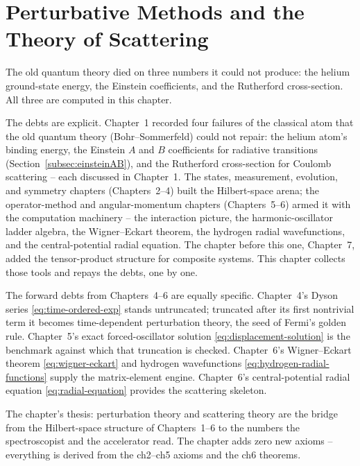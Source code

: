 \chapter{Perturbative Methods and the Theory of Scattering}

The old quantum theory died on three numbers it could not produce: the helium ground-state energy, the Einstein coefficients, and the Rutherford cross-section. All three are computed in this chapter.

The debts are explicit. Chapter~1 recorded four failures of the classical atom that the old quantum theory (Bohr--Sommerfeld) could not repair: the helium atom's binding energy, the Einstein $A$ and $B$ coefficients for radiative transitions (Section~\ref{subsec:einsteinAB}), and the Rutherford cross-section for Coulomb scattering -- each discussed in Chapter~1. The states, measurement, evolution, and symmetry chapters (Chapters~2--4) built the Hilbert-space arena; the operator-method and angular-momentum chapters (Chapters~5--6) armed it with the computation machinery -- the interaction picture, the harmonic-oscillator ladder algebra, the Wigner--Eckart theorem, the hydrogen radial wavefunctions, and the central-potential radial equation. The chapter before this one, Chapter~7, added the tensor-product structure for composite systems. This chapter collects those tools and repays the debts, one by one.

The forward debts from Chapters~4--6 are equally specific. Chapter~4's Dyson series \eqref{eq:time-ordered-exp} stands untruncated; truncated after its first nontrivial term it becomes time-dependent perturbation theory, the seed of Fermi's golden rule. Chapter~5's exact forced-oscillator solution \eqref{eq:displacement-solution} is the benchmark against which that truncation is checked. Chapter~6's Wigner--Eckart theorem \eqref{eq:wigner-eckart} and hydrogen wavefunctions \eqref{eq:hydrogen-radial-functions} supply the matrix-element engine. Chapter~6's central-potential radial equation \eqref{eq:radial-equation} provides the scattering skeleton.

The chapter's thesis: perturbation theory and scattering theory are the bridge from the Hilbert-space structure of Chapters~1--6 to the numbers the spectroscopist and the accelerator read. The chapter adds zero new axioms -- everything is derived from the ch2--ch5 axioms and the ch6 theorems.

